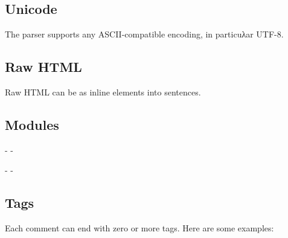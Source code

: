 \subsection{Unicode\label{unicode}}%
\begin{flushleft}\end{flushleft}%
The parser supports any ASCII-compatible encoding, in particuλar UTF-8.

\subsection{Raw HTML\label{raw-html}}%
\begin{flushleft}\end{flushleft}%
Raw HTML can be  as inline elements into sentences.

\subsection{Modules\label{modules}}%
\begin{description}\kern-\topsep
\makeatletter\advance\@topsepadd-\topsep\makeatother%
\item[{\ocamlinlinecode{X}}]{}\end{description}%
\begin{description}\kern-\topsep
\makeatletter\advance\@topsepadd-\topsep\makeatother%
\item[{\ocamlinlinecode{X}}]{}%
\item[{\ocamlinlinecode{Y}}]{}%
\item[{\ocamlinlinecode{Z}}]{}\end{description}%
\subsection{Tags\label{tags}}%
\begin{flushleft}\end{flushleft}%
Each comment can end with zero or more tags. Here are some examples:

